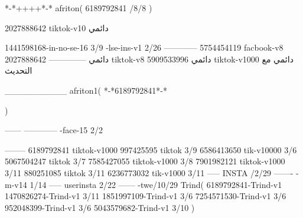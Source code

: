 *-*++++*-*
afriton(
6189792841 /8/8
)

2027888642 tiktok-v10
دائمي

1441598168-in-no-se-16 3/9
-lse-ins-v1 2/26
------------
5754454119 facbook-v8
دائمي
--------------
2027888642 tiktok-v8
دائمي
5909533996 tiktok-v1000
دائمي مع التحديث

__________
afriton1(
*-*6189792841*-*

)


------
------------
-face-15 2/2

--------
6189792841 tiktok-v1000
997425595 tiktok 3/9
6586413650 tik-v10000 3/6
5067504247 tiktok 3/7
7585427055 tiktok-v1000 3/8
7901982121 tiktok-v1000 3/11
880251085 tiktok 3/11
6236773032 tik-v1000 3/11
-----
 INSTA /2/29
-------
-m-v14 1/14
-----
userinsta 2/22
------
-twe/10/29
Trind(
6189792841-Trind-v1 
1470826274-Trind-v1 3/11
1851997109-Trind-v1 3/6
7254571530-Trind-v1 3/6
952048399-Trind-v1 3/6
5043579682-Trind-v1 3/10
)

